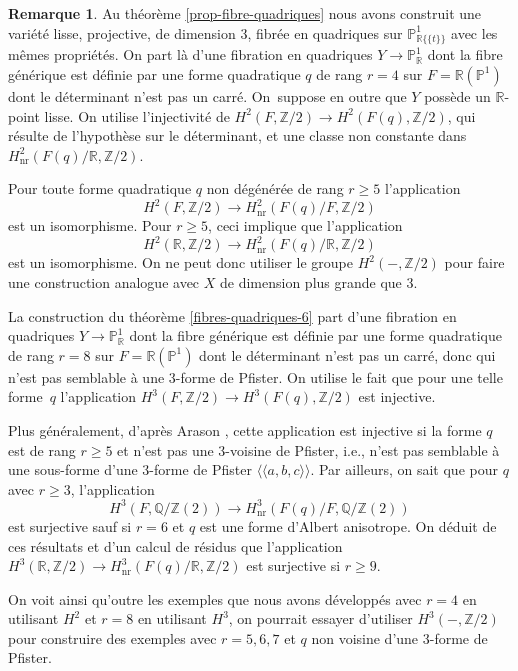 \documentclass[11pt]{article}
\newcommand{\ie}{i.e.,\xspace}
\theoremstyle{definition}
\newtheorem{rmk}[thm]{Remarque}
\newcommand{\Q}{\mathbb Q}
\newcommand{\Z}{\mathbb Z}
\newcommand{\R}{\mathbb R}
\renewcommand{\P}{\mathbb P}
\newcommand{\on}[1]{\operatorname{#1}}
\newcommand{\puiseux}{\mathbb{R}\{\!\{t\}\!\}}
\begin{document}
\begin{rmk}\label{autrescontrex} Au théorème \ref{prop-fibre-quadriques} nous avons construit une variété
lisse, projective, de dimension $3$, fibrée en quadriques sur $\P^1_{\puiseux}$ avec les mêmes propriétés.
On part là d'une fibration
en quadriques $Y \to \P^1_\R$ dont la fibre générique est définie par une forme quadratique $q$ de rang $r=4$ sur $F=\R(\P^1)$
dont le déterminant n'est pas un carré. On~suppose en outre
que $Y$ possède un $\R$-point lisse.
On utilise
l'injectivité de $H^2(F,\Z/2) \to H^2(F(q), \Z/2)$,
qui résulte de l'hypothèse sur le déterminant,
et une classe non constante dans $H^2_{\on{nr}}(F(q)/\R, \Z/2)$.

Pour toute forme quadratique $q$ non dégénérée de rang $r\geq 5$
l'application \[
H^2(F,\Z/2) \to H^2_{\on{nr}}(F(q)/F, \Z/2)
\]
est un isomorphisme.
Pour $r\geq 5$, ceci implique que l'application
\[
H^2(\R,\Z/2) \to H^2_{\on{nr}}(F(q)/\R, \Z/2)
\]
est un isomorphisme.
On ne peut donc utiliser le groupe
$H^2(-, \Z/2)$ pour faire une construction analogue
avec $X$ de dimension plus grande que 3.

La construction du théorème \ref{fibres-quadriques-6}
part d'une fibration
en quadriques $Y \to \P^1_\R$ dont la fibre générique est définie par une forme quadratique de rang $r= 8$ sur $F=\R(\P^1)$
dont le déterminant n'est pas un carré, donc qui n'est pas semblable à une 3-forme de Pfister.
On utilise le fait que pour une telle forme~$q$ l'application
$H^3(F,\Z/2) \to H^3(F(q), \Z/2)$ est injective.

Plus généralement, d'après Arason \cite[Satz 5.6]{arason1975cohomologische},
cette application est injective si la forme $q$
est de rang $r\geq 5$ et n'est pas une 3-voisine de Pfister, \ie
n'est pas semblable à une sous-forme d'une 3-forme
de Pfister $\langle \!\langle a,b,c \rangle \!\rangle$.
Par ailleurs, on sait \cite[Th.\,10.2.4]{kahn2008formes} que pour $q$ avec $r\geq 3$, l'application
\[
H^3(F, \Q/\Z(2)) \to H^3_{\on{nr}}(F(q)/F, \Q/\Z(2))
\]
est surjective sauf si $r=6$ et $q$
est une forme d'Albert anisotrope.
On déduit de ces résultats et d'un calcul de résidus
que l'application $H^3(\R, \Z/2) \to H^3_{\on{nr}}(F(q)/\R, \Z/2)$
est surjective si $r\geq 9$.

On voit ainsi qu'outre les exemples que nous avons développés avec $r=4$ en utilisant $H^2$ et $r=8$ en utilisant $H^3$, on pourrait essayer d'utiliser $H^3(-, \Z/2)$ pour construire des exemples avec $r=5,6,7$ et $q$ non voisine d'une 3-forme de Pfister.
\end{rmk}
\end{document}
